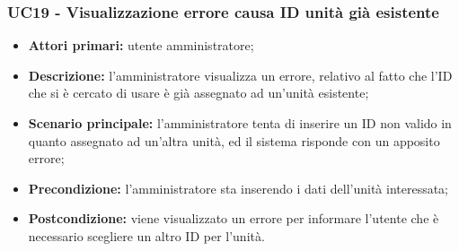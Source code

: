 \subsubsection{UC19 - Visualizzazione errore causa ID unità già esistente}
	\begin{itemize}
		\item \textbf{Attori primari:} utente amministratore;
		\item \textbf{Descrizione:} l'amministratore visualizza un errore, relativo al fatto che l'ID che si è cercato di usare è già assegnato ad un'unità esistente;
		\item \textbf{Scenario principale:} l'amministratore tenta di inserire un ID non valido in quanto assegnato ad un'altra unità, ed il sistema risponde con un apposito errore;
		\item \textbf{Precondizione:} l'amministratore sta inserendo i dati dell'unità interessata;
		\item \textbf{Postcondizione:} viene visualizzato un errore per informare l'utente che è necessario scegliere un altro ID per l'unità.
	\end{itemize}